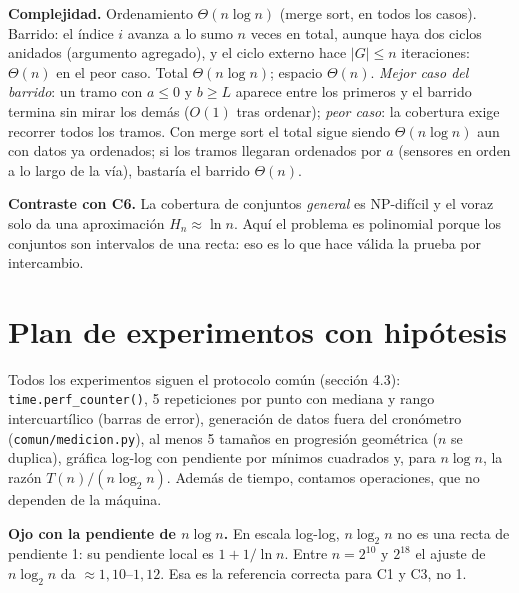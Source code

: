\documentclass[11pt,letterpaper]{article}
\theoremstyle{plain}
\theoremstyle{definition}
\newcommand{\Th}{\Theta}
\newcommand{\cajah}[1]{\par\smallskip\colorbox{fondo}{\parbox{\dimexpr\linewidth-2\fboxsep}{\small #1}}\par\smallskip}
\begin{document}
\textbf{Complejidad.} Ordenamiento $\Th(n\log n)$ (merge sort, en todos los casos). Barrido: el índice
$i$ avanza a lo sumo $n$ veces en total, aunque haya dos ciclos anidados (argumento agregado), y el ciclo
externo hace $|G|\le n$ iteraciones: $\Th(n)$ en el peor caso. Total $\Th(n\log n)$; espacio $\Th(n)$.
\emph{Mejor caso del barrido}: un tramo con $a\le 0$ y $b\ge L$ aparece entre los primeros y el
barrido termina sin mirar los demás ($O(1)$ tras ordenar); \emph{peor caso}: la cobertura exige
recorrer todos los tramos. Con merge sort el total sigue siendo $\Th(n\log n)$ aun con datos ya
ordenados; si los tramos llegaran ordenados por $a$ (sensores en orden a lo largo de la vía), bastaría
el barrido $\Th(n)$.

\cajah{\textbf{Contraste con C6.} La cobertura de conjuntos \emph{general} es NP-difícil y el voraz
solo da una aproximación $H_n\approx\ln n$. Aquí el problema es polinomial porque los conjuntos son
intervalos de una recta: eso es lo que hace válida la prueba por intercambio.}
\section{Plan de experimentos con hipótesis}\label{sec:plan}

Todos los experimentos siguen el protocolo común (sección 4.3): \texttt{time.perf\_counter()},
5 repeticiones por punto con mediana y rango intercuartílico (barras de error), generación de datos
fuera del cronómetro (\texttt{comun/medicion.py}), al menos 5 tamaños en progresión geométrica
($n$ se duplica), gráfica log-log con pendiente por mínimos cuadrados y, para $n\log n$, la razón
$T(n)/(n\log_2 n)$. Además de tiempo, contamos operaciones, que no dependen de la máquina.

\cajah{\textbf{Ojo con la pendiente de $n\log n$.} En escala log-log, $n\log_2 n$ no es una recta de
pendiente 1: su pendiente local es $1+1/\ln n$. Entre $n=2^{10}$ y $2^{18}$ el ajuste de
$n\log_2 n$ da $\approx1{,}10$--$1{,}12$. Esa es la referencia correcta para C1 y C3, no 1.}
\end{document}
